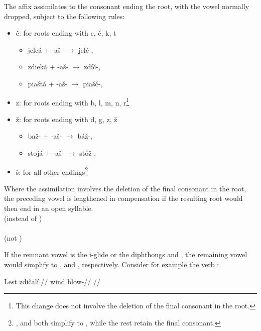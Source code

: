 The affix  assimilates to the consonant ending the root, with the vowel  normally dropped, subject to the following rules:
\begin{itemize} 
	\item \v{c}: for roots ending with c, \v{c}, k, t
	\begin{itemize}
		\item jelc\'a + -a\v{s}- $\rightarrow$ jel\v{c}-, 
		\item zdiek\'a + -a\v{s}- $\rightarrow$ zd\'i\v{c}-, 
		\item pia\v{s}t\'a + -a\v{s}- $\rightarrow$ pia\v{s}\v{c}-, 
	\end{itemize}
	\item z: for roots ending with b, l, m, n, r\footnote{This change does not involve the deletion of the final consonant in the root.}
	\item \v{z}: for roots ending with d, g, z, \v{z}
	\begin{itemize}
		\item ba\v{z}- + -a\v{s}- $\rightarrow$ b\'a\v{z}-, 
		\item stoj\'a + -a\v{s}- $\rightarrow$ st\'o\v{z}-, 
	\end{itemize}
	\item \v{s}: for all other endings\footnote{ ,  and  both simplify to , while the rest retain the final consonant.}
\end{itemize}

Where the assimilation involves the deletion of the final consonant in the root, the preceding vowel is lengthened in compensation if the resulting root would then end in an open syllable.
\pex
{}\\
(instead of )\\
\xe
\pex
{}\\
(not )\\
\xe

If the remnant vowel is the i-glide  or the diphthongs  and , the remaining vowel would simplify to ,  and , respectively. Consider for example the verb  :

\pex
\begingl
\gla Lest zdi\v{c}al\'i.//
\glb wind blow-//
\glft {}//
\endgl
\xe

